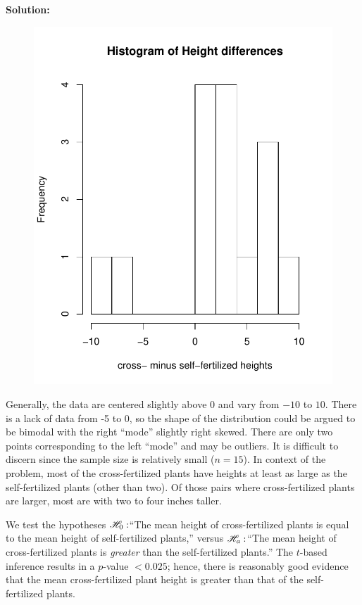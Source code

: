 \documentclass{homework}
\begin{document}
\newpage
{}

{\bf Solution:}

\begin{figure}
\vspace{-20pt}
\begin{center}
\includegraphics[width=.48\textwidth]{darwin_hist.pdf}
\end{center}
\vspace{-20pt}
\end{figure}
Generally, the data are centered slightly above 0 and vary from $-10$ to $10$.  There is a lack of data from -5 to 0, so the shape of the distribution could be argued to be bimodal with the right ``mode'' slightly right
skewed. There are only two points corresponding to the left ``mode'' and may be
outliers. It is difficult to discern since the sample size is relatively
small ($n=15$). In context of the problem, most of the cross-fertilized plants have
heights at least as large as the self-fertilized plants (other than two).  Of
those pairs where cross-fertilized plants are larger, most are with two to four
inches taller.  


\begin{solution} 
We test the hypotheses $\mathscr H_0:$``The mean height of cross-fertilized plants is
equal to the mean height of self-fertilized plants,'' versus  $\mathscr H_a:$``The mean
height of cross-fertilized plants is \emph{greater} than the self-fertilized plants.''
The $t$-based inference results in a $p$-value $<0.025$; hence, there is reasonably good evidence
that the mean cross-fertilized plant height is greater than that of the
self-fertilized plants.
\end{solution}
\end{document}
